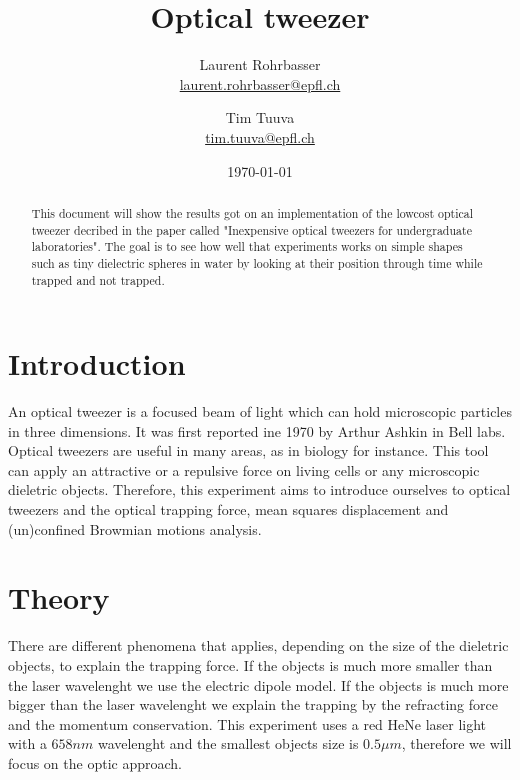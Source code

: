 \documentclass[a4paper,12pt,twoside]{article}	%
\newcommand{\mail}[1]{{\href{mailto:#1}{#1}}}
\begin{document}
\title{Optical tweezer}
\date{\today}
\author{
	Laurent Rohrbasser\\{\small \mail{laurent.rohrbasser@epfl.ch}} \and 
	Tim Tuuva\\{\small \mail{tim.tuuva@epfl.ch}}
	}
\maketitle

\tableofcontents %

\baselineskip=16pt
\parindent=15pt
\parskip=5pt

\begin{abstract}

This document will show the results got on an implementation of the lowcost optical tweezer decribed in the paper called "Inexpensive optical tweezers for undergraduate laboratories". The goal is to see how well that experiments works on simple shapes such as tiny dielectric spheres in water by looking at their position through time while trapped and not trapped.

\end{abstract}

\section{Introduction}
An optical tweezer is a focused beam of light which can hold microscopic particles in three dimensions. It was first reported ine 1970 by Arthur Ashkin in Bell labs. Optical tweezers are useful in many areas, as in biology for instance. This tool can apply an attractive or a repulsive force on living cells or any microscopic dieletric objects. Therefore, this experiment aims to introduce ourselves to optical tweezers and the optical trapping force, mean squares displacement and (un)confined Browmian motions analysis.


\section{Theory}
There are different phenomena that applies, depending on the size of the dieletric objects, to explain the trapping force.
If the objects is much more smaller than the laser wavelenght we use the electric dipole model.
If the objects is much more bigger than the laser wavelenght we explain the trapping by the refracting force and the momentum conservation.
This experiment uses a red HeNe laser light with a $658 nm$ wavelenght and the smallest objects size is $0.5\mu m$, %
therefore we will focus on the optic approach.
\end{document}

